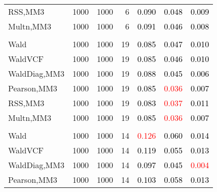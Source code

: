 \documentclass[
]{article}
\begin{document}
\begin{table}[H]
{\begin{tabular}[t]{lrrrrrr}
\hspace{1em}RSS,MM3 & 1000 & 1000 & 6 & \textcolor{black}{0.090} & \textcolor{black}{0.048} & \textcolor{black}{0.009}\\
\hspace{1em}Multn,MM3 & 1000 & 1000 & 6 & \textcolor{black}{0.091} & \textcolor{black}{0.046} & \textcolor{black}{0.008}\\
\addlinespace[0.3em]
\multicolumn{7}{l}{\textbf{1F 15V}}\\
\hspace{1em}Wald & 1000 & 1000 & 19 & \textcolor{black}{0.085} & \textcolor{black}{0.047} & \textcolor{black}{0.010}\\
\hspace{1em}WaldVCF & 1000 & 1000 & 19 & \textcolor{black}{0.085} & \textcolor{black}{0.046} & \textcolor{black}{0.010}\\
\hspace{1em}WaldDiag,MM3 & 1000 & 1000 & 19 & \textcolor{black}{0.088} & \textcolor{black}{0.045} & \textcolor{black}{0.006}\\
\hspace{1em}Pearson,MM3 & 1000 & 1000 & 19 & \textcolor{black}{0.085} & \textcolor{red}{0.036} & \textcolor{black}{0.007}\\
\hspace{1em}RSS,MM3 & 1000 & 1000 & 19 & \textcolor{black}{0.083} & \textcolor{red}{0.037} & \textcolor{black}{0.011}\\
\hspace{1em}Multn,MM3 & 1000 & 1000 & 19 & \textcolor{black}{0.085} & \textcolor{red}{0.036} & \textcolor{black}{0.007}\\
\addlinespace[0.3em]
\multicolumn{7}{l}{\textbf{2F 10V}}\\
\hspace{1em}Wald & 1000 & 1000 & 14 & \textcolor{red}{0.126} & \textcolor{black}{0.060} & \textcolor{black}{0.014}\\
\hspace{1em}WaldVCF & 1000 & 1000 & 14 & \textcolor{black}{0.119} & \textcolor{black}{0.055} & \textcolor{black}{0.013}\\
\hspace{1em}WaldDiag,MM3 & 1000 & 1000 & 14 & \textcolor{black}{0.097} & \textcolor{black}{0.045} & \textcolor{red}{0.004}\\
\hspace{1em}Pearson,MM3 & 1000 & 1000 & 14 & \textcolor{black}{0.103} & \textcolor{black}{0.058} & \textcolor{black}{0.013}\\

\end{tabular}}
\end{table}
\end{document}
